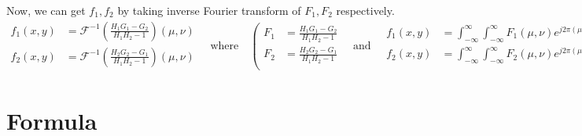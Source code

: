 \documentclass[a4paper, landscape]{article}
\renewcommand{\d}{\, \mathrm{d}}
\begin{document}
Now, we can get $f_1, f_2$ by taking inverse Fourier transform of $F_1, F_2$ respectively.
\begin{equation}
	\begin{aligned}
		f_1(x,y) &= \mathcal{F}^{-1}\left(\frac{H_1G_1 - G_2}{H_1H_2 - 1}\right)(\mu,\nu)\\
		f_2(x,y) &= \mathcal{F}^{-1}\left(\frac{H_2G_2 - G_1}{H_1H_2 - 1}\right)(\mu,\nu)\\
	\end{aligned}
	\quad\text{where}\quad
	\left(
	\begin{aligned}
		F_1 &= \frac{H_1G_1 - G_2}{H_1H_2 - 1}\\
		F_2 &= \frac{H_2G_2 - G_1}{H_1H_2 - 1}\\
	\end{aligned}
	\quad\text{and}\quad
	\begin{aligned}
		f_1(x,y) &= \int_{-\infty}^{\infty}\int_{-\infty}^{\infty}F_1(\mu, \nu)e^{j2\pi(\mu x+\nu y)}\d\mu\\
		f_2(x,y) &= \int_{-\infty}^{\infty}\int_{-\infty}^{\infty}F_2(\mu, \nu)e^{j2\pi(\mu x+\nu y)}\d\mu\\
	\end{aligned}
	\right)
\end{equation}
\section{Formula}
\end{document}
